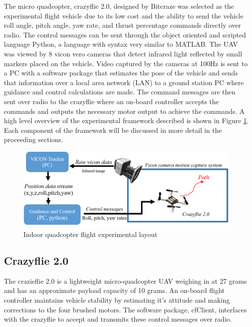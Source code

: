 \documentclass[numbered,pdftex]{ohio-etd}
\begin{document}
The micro quadcopter, crazyflie 2.0, designed by Bitcraze was selected as the experimental flight vehicle due to its low cost and the ability to send the vehicle roll angle, pitch angle, yaw rate, and thrust percentage commands directly over radio. The control messages can be sent through the object oriented and scripted language Python, a language with syntax very similar to MATLAB. The UAV was viewed by 8 vicon vero cameras that detect infrared light reflected by small markers placed on the vehicle. Video captured by the cameras at 100Hz is sent to a PC with a software package that estimates the pose of the vehicle and sends that information over a local area network (LAN) to a ground station PC where guidance and control calculations are made. The command messages are then sent over radio to the crazyflie where an on-board controller accepts the commands and outputs the necessary motor output to achieve the commands. A high level overview of the experimental framework described is shown in Figure \ref{fig:experimentalFramework}. Each component of the framework will be discussed in more detail in the proceeding sections. 

\begin{figure}
	\centering
	\includegraphics[trim=0 0 0 0,clip,width=15cm]{PaperFigures/Methods/experimentalSetup}
	\caption{Indoor quadcopter flight experimental layout}
	\label{fig:experimentalFramework}
\end{figure}

\subsection{Crazyflie 2.0}
The crazieflie 2.0 is a lightweight micro-quadcopter UAV weighing in at 27 grams and has an approximate payload capacity of 10 grams. An on-board flight controller maintains vehicle stability by estimating it's attitude and making corrections to the four brushed motors. The software package, cfClient, interfaces with the crazyflie to accept and transmits these control messages over radio. 
\end{document}
